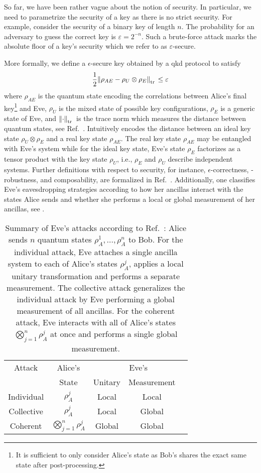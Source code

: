 So far, we have been rather vague about the notion of security.
In particular, we need to parametrize the security of a key as there is no strict security.
For example, consider the security of a binary key of length $n$.
The probability for an adversary to guess the correct key is $\varepsilon=2^{-n}$.
Such a brute-force attack marks the absolute floor of a key's security which we refer to as $\varepsilon$-secure.

More formally, we define a $\epsilon$-secure key obtained by a \gls{qkd} protocol to satisfy~\cite[p.~10]{Scarani2009}
\begin{equation}
	\frac{1}{2}
	\norm{\rho_{AE}-\rho_U\otimes\rho_E}_{\trace{}}
	\leq
	\varepsilon
	\label{eq:qkd_security}
\end{equation}
where $\rho_{AE}$ is the quantum state encoding the correlations between Alice's final key\footnote{It is sufficient to only consider Alice's state as Bob's shares the exact same state after post-processing.} and Eve, $\rho_U$ is the mixed state of possible key configurations, $\rho_E$ is a generic state of Eve, and $\norm{\cdot}_{\trace{}}$ is the trace norm which measures the distance between quantum states, see Ref.~\cite[p.~49]{Wolf2021}.
Intuitively  encodes the distance between an ideal key state $\rho_U\otimes\rho_E$ and a real key state $\rho_{AE}$.
The real key state $\rho_{AE}$ may be entangled with Eve's system while for the ideal key state, Eve's state $\rho_E$ factorizes as a tensor product with the key state $\rho_U$, i.e., $\rho_E$ and $\rho_U$ describe independent systems.
Further definitions with respect to security, for instance, $\epsilon$-correctness, -robustness, and composability, are formalized in Ref.~\cite[p.~119]{Wolf2021}.
Additionally, one classifies Eve's eavesdropping strategies according to how her ancillas interact with the states Alice sends and whether she performs a local or global measurement of her ancillas, see .
\begin{table}[htb]
	\centering
	\begin{tabular}{ccccc}
		\toprule
			Attack & Alice's & \multicolumn{3}{c}{Eve's} \\
			\cmidrule{3-5}
			& State & Unitary & Measurement \\
		\midrule
			Individual & $\rho_A^j$ & Local & Local \\
			Collective & $\rho_A^j$ & Local & Global \\
			Coherent & $\bigotimes_{j=1}^n\rho_A^j$ & Global & Global \\
		\bottomrule
	\end{tabular}
	\caption{Summary of Eve's attacks according to Ref.~\cite[p.~128]{Wolf2021}: Alice sends $n$ quantum states $\rho_A^1,\dots,\rho_A^n$ to Bob. For the individual attack, Eve attaches a single ancilla system to each of Alice's states $\rho_A^j$, applies a local unitary transformation and performs a separate measurement. The collective attack generalizes the individual attack by Eve performing a global measurement of all ancillas. For the coherent attack, Eve interacts with all of Alice's states $\bigotimes_{j=1}^n\rho_A^j$ at once and performs a single global measurement.}\label{tab:eavesdropping_strategies}
\end{table}
